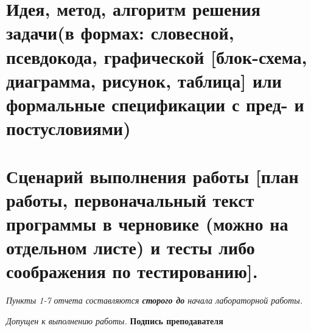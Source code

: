 \section{Идея, метод, алгоритм \textnormal{\small решения задачи(в формах: словесной, псевдокода, графической [блок-схема, диаграмма, рисунок,
     \singlespace таблица] или формальные спецификации с пред- и постусловиями)}}

\vspace{0.4\textheight}

\section{Сценарий выполнения работы \textnormal{\small [план работы, первоначальный текст программы в черновике (можно на отдельном листе) и
     \singlespace тесты либо соображения по тестированию].}}

\vspace{0.45\textheight}

\textit{Пункты 1-7 отчета составляются \textbf{сторого до} начала лабораторной работы.}

\begin{flushright}
  \textit{Допущен к выполнению работы.} \textbf{Подпись преподавателя} \uline{\hspace{3cm}}
\end{flushright}

\newpage